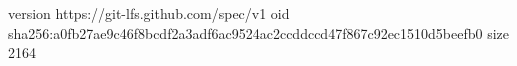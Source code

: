 version https://git-lfs.github.com/spec/v1
oid sha256:a0fb27ae9c46f8bcdf2a3adf6ac9524ac2ccddccd47f867c92ec1510d5beefb0
size 2164
